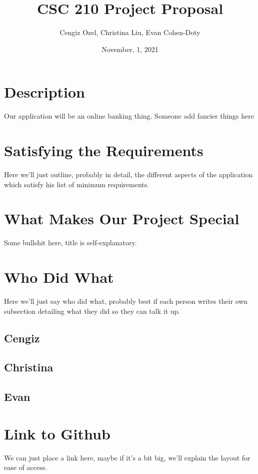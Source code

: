 \documentclass{article}
\title{CSC 210 Project Proposal}
\author{Cengiz Ozel, Christina Liu, Evan Cohen-Doty}
\date{November, 1, 2021}
\begin{document}
\maketitle

\section{Description}
Our application will be an online banking thing. Someone add fancier things here


\section{Satisfying the Requirements}

Here we'll just outline, probably in detail, the different aspects of the application which satisfy his list of minimum requirements.

\section{What Makes Our Project Special}

Some bullshit here, title is self-explanatory.

\section{Who Did What}

Here we'll just say who did what, probably best if each person writes their own subsection detailing what they did so they can talk it up.
\subsection{Cengiz}

\subsection{Christina}

\subsection{Evan}

\section{Link to Github}

We can just place a link here, maybe if it's a bit big, we'll explain the layout for ease of access.
\end{document}

